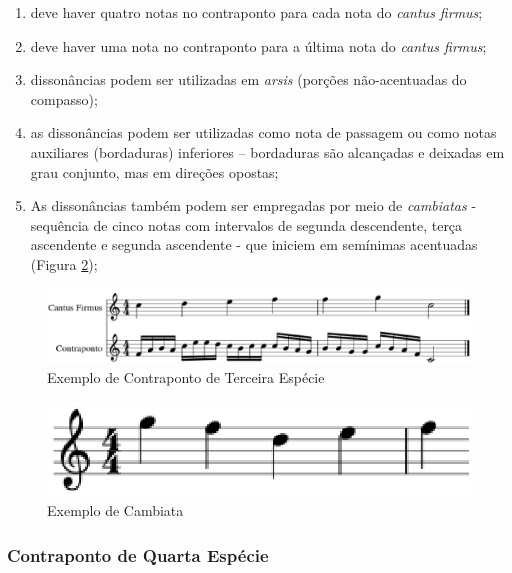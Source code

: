         \begin{enumerate}
          \item deve haver quatro notas no contraponto para cada nota do \textit{cantus firmus};
          \item deve haver uma nota no contraponto para a última nota do \textit{cantus firmus};
          \item dissonâncias podem ser utilizadas em \textit{arsis} (porções não-acentuadas do compasso);
          \item as dissonâncias podem ser utilizadas como nota de passagem ou como notas auxiliares (bordaduras) inferiores -- bordaduras são alcançadas e deixadas em grau conjunto, mas em direções opostas;
          \item As dissonâncias também podem ser empregadas por meio de \textit{cambiatas} - sequência de cinco notas com intervalos de segunda descendente, terça ascendente e segunda ascendente - que iniciem em semínimas acentuadas (Figura \ref{cambiata});
        \end{enumerate}

        \begin{figure}[htb]
          \centering
          \includegraphics[scale=0.55]{figuras/contrapontoterceira.eps}
          \caption{Exemplo de Contraponto de Terceira Espécie}
          \label{contrapontoterceira}
        \end{figure}

        \begin{figure}[htb]
          \centering
          \includegraphics[scale=0.55]{figuras/cambiata.eps}
          \caption{Exemplo de Cambiata}
          \label{cambiata}
        \end{figure}

      \subsubsection[Contraponto de Quarta Espécie]{Contraponto de Quarta Espécie}


